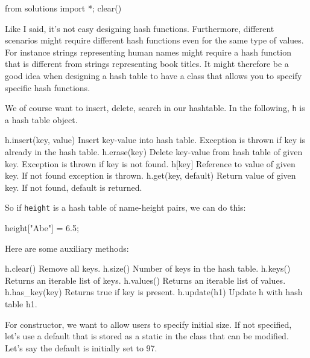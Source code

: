 \begin{python0}
from solutions import *; clear()
\end{python0}

Like I said, it's not easy designing hash functions.
Furthermore, different scenarios might require different hash functions
even for the same type of values.
For instance strings representing human names might
require a hash function that is different from
strings representing book titles.
It might therefore be a good idea when designing a hash table 
to have a class that allows you to specify specific hash functions.

We of course want to insert, delete, search in our hashtable.
In the following, \verb!h! is a hash table object.
\begin{console}
h.insert(key, value) Insert key-value into hash table. 
                     Exception is thrown if key is 
                     already in the hash table.
h.erase(key)         Delete key-value from hash table of 
                     given key.
                     Exception is thrown if key is not 
                     found.
h[key]               Reference to value of given key.
                     If not found exception is thrown.
h.get(key, default)  Return value of given key. If not 
                     found, default is returned.
\end{console}
So if \verb!height! is a hash table of name-height pairs,
we can do this:
\begin{console}
height["Abe"] = 6.5;
\end{console}
Here are some auxiliary methods:
\begin{console}
h.clear()            Remove all keys.
h.size()             Number of keys in the hash table.
h.keys()             Returns an iterable list of keys.
h.values()           Returns an iterable list of values.
h.has_key(key)       Returns true if key is present.
h.update(h1)         Update h with hash table h1.
\end{console}


For constructor, we want to allow users to specify initial size.
If not specified, let's use a default that is stored as a static 
in the class that can be modified. 
Let's say the default is initially set to 97.




\newpage
